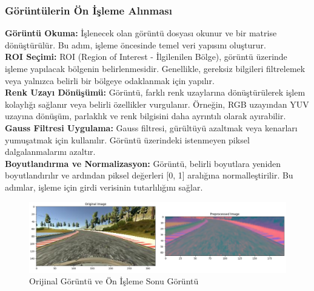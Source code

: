 \documentclass{article}
\begin{document}
\subsubsection{Görüntülerin Ön İşleme Alınması}
\textbf{Görüntü Okuma:} İşlenecek olan görüntü dosyası okunur ve bir matrise dönüştürülür. Bu adım, işleme öncesinde temel veri yapısını oluşturur. \\
\textbf{ROI Seçimi:} ROI (Region of Interest - İlgilenilen Bölge), görüntü üzerinde işleme yapılacak bölgenin belirlenmesidir. Genellikle, gereksiz bilgileri filtrelemek veya yalnızca belirli bir bölgeye odaklanmak için yapılır. \\
\textbf{Renk Uzayı Dönüşümü:} Görüntü, farklı renk uzaylarına dönüştürülerek işlem kolaylığı sağlanır veya belirli özellikler vurgulanır. Örneğin, RGB uzayından YUV uzayına dönüşüm, parlaklık ve renk bilgisini daha ayrıntılı olarak ayırabilir. \\
\textbf{Gauss Filtresi Uygulama:} Gauss filtresi, gürültüyü azaltmak veya kenarları yumuşatmak için kullanılır. Görüntü üzerindeki istenmeyen piksel dalgalanmalarını azaltır. \\
\textbf{Boyutlandırma ve Normalizasyon:} Görüntü, belirli boyutlara yeniden boyutlandırılır ve ardından piksel değerleri [0, 1] aralığına normalleştirilir. Bu adımlar, işleme için girdi verisinin tutarlılığını sağlar.
\begin{figure}[h]
  \centering
  \includegraphics[width=1\textwidth]{image/Resim65.PNG} %
\caption{Orijinal Görüntü ve Ön İşleme Sonu Görüntü}
  \label{fig:cnnmimari}  
\end{figure}
\end{document}
